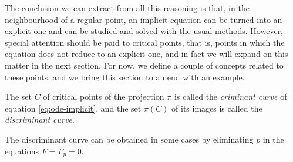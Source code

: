 The conclusion we can extract from all this reasoning is that, in the neighbourhood of a regular point, an implicit equation can be turned into an explicit one and can be studied and solved with the usual methods. However, special attention should be paid to critical points, that is, points in which the equation does not reduce to an explicit one, and in fact we will expand on this matter in the next section. For now, we define a couple of concepts related to these points, and we bring this section to an end with an example.

\begin{definition} The set $C$ of critical points of the projection $\pi$ is called the \textit{criminant curve} of equation \eqref{eq:ode-implicit}, and the set $\pi(C)$ of its images is called the \textit{discriminant curve}.
\end{definition}

\begin{remark} The discriminant curve can be obtained in some cases by eliminating $p$ in the equations $F=F_p=0$.

\end{remark}

